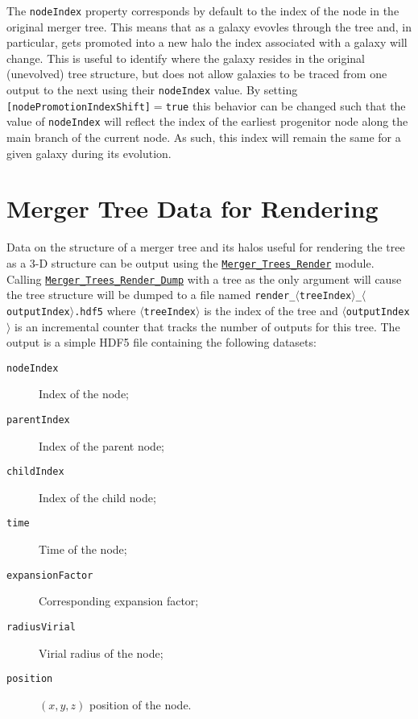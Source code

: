 The {\tt nodeIndex} property corresponds by default to the index of the node in the original merger tree. This means that as a galaxy evovles through the tree and, in particular, gets promoted into a new halo the index associated with a galaxy will change. This is useful to identify where the galaxy resides in the original (unevolved) tree structure, but does not allow galaxies to be traced from one output to the next using their {\tt nodeIndex} value. By setting {\tt [nodePromotionIndexShift]}$=${\tt true} this behavior can be changed such that the value of {\tt nodeIndex} will reflect the index of the earliest progenitor node along the main branch of the current node. As such, this index will remain the same for a given galaxy during its evolution.

\section{Merger Tree Data for Rendering}

Data on the structure of a merger tree and its halos useful for rendering the tree as a 3-D structure can be output using the \hyperlink{merger_trees.render.F90:merger_trees_render}{\tt Merger\_Trees\_Render} module. Calling \hyperlink{merger_trees.render.F90:merger_trees_render:merger_trees_render_dump}{\tt Merger\_Trees\_Render\_Dump} with a tree as the only argument will cause the tree structure will be dumped to a file named {\tt render\_$\langle$treeIndex$\rangle$\_$\langle$outputIndex$\rangle$.hdf5} where $\langle${\tt treeIndex}$\rangle$ is the index of the tree and $\langle${\tt outputIndex}$\rangle$ is an incremental counter that tracks the number of outputs for this tree. The output is a simple HDF5 file containing the following datasets:
\begin{description}
 \item [{\tt nodeIndex}] Index of the node;
 \item [{\tt parentIndex}] Index of the parent node;
 \item [{\tt childIndex}] Index of the child node;
 \item [{\tt time}] Time of the node;
 \item [{\tt expansionFactor}] Corresponding expansion factor;
 \item [{\tt radiusVirial}] Virial radius of the node;
 \item [{\tt position}] $(x,y,z)$ position of the node.
\end{description}


